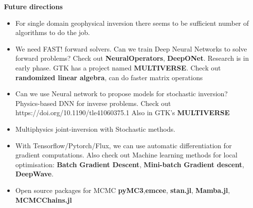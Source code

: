 \documentclass[aspectratio=169]{beamer}
\begin{document}
\begin{frame}{\textbf{Future directions}}
\begin{itemize}
    \item [$\bullet$] For single domain geophysical inversion there seems to be sufficient number of algorithms to do the job.
    \item [$\bullet$] We need FAST! forward solvers. Can we train Deep Neural Networks to solve forward problems? Check out \textbf{NeuralOperators}, \textbf{DeepONet}. Research is in early phase. GTK has a project named \textbf{MULTIVERSE}. Check out \textbf{randomized linear algebra}, can do faster matrix operations 
    \item [$\bullet$] Can we use Neural network to propose models for stochastic inversion? Physics-based DNN for inverse problems. Check out {https://doi.org/10.1190/tle41060375.1} Also in GTK's \textbf{MULTIVERSE} 
    \item [$\bullet$] Multiphysics joint-inversion with Stochastic methods.
    \item [$\bullet$] With Tensorflow/Pytorch/Flux, we can use automatic differentiation for gradient computations. Also check out Machine learning methods for local optimisation: \textbf{Batch Gradient Descent}, \textbf{Mini-batch Gradient descent}, \textbf{DeepWave}.
    \item [$\bullet$] Open source packages for MCMC \textbf{pyMC3},\textbf{emcee}, \textbf{stan.jl}, \textbf{Mamba.jl}, \textbf{MCMCChains.jl}   
     
\end{itemize}


\end{frame}
\end{document}
